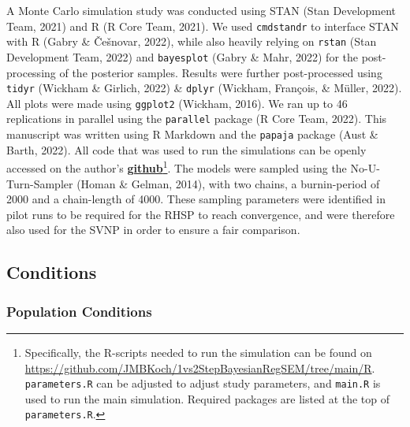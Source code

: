\documentclass[
  man, donotrepeattitle,floatsintext]{apa6}
\begin{document}
A Monte Carlo simulation study was conducted using STAN (Stan Development Team, 2021) and R (R Core Team, 2021). We used \texttt{cmdstandr} to interface STAN with R (Gabry \& Češnovar, 2022), while also heavily relying on \texttt{rstan} (Stan Development Team, 2022) and \texttt{bayesplot} (Gabry \& Mahr, 2022) for the post-processing of the posterior samples. Results were further post-processed using \texttt{tidyr} (Wickham \& Girlich, 2022) \& \texttt{dplyr} (Wickham, François, \& Müller, 2022). All plots were made using \texttt{ggplot2} (Wickham, 2016). We ran up to 46 replications in parallel using the \texttt{parallel} package (R Core Team, 2022). This manuscript was written using R Markdown and the \texttt{papaja} package (Aust \& Barth, 2022). All code that was used to run the simulations can be openly accessed on the author's \href{https://github.com/JMBKoch/1vs2StepBayesianRegSEM}{\textbf{github}}\footnote{Specifically, the R-scripts needed to run the simulation can be found on \url{https://github.com/JMBKoch/1vs2StepBayesianRegSEM/tree/main/R}. \texttt{parameters.R} can be adjusted to adjust study parameters, and \texttt{main.R} is used to run the main simulation. Required packages are listed at the top of \texttt{parameters.R}.}. The models were sampled using the No-U-Turn-Sampler (Homan \& Gelman, 2014), with two chains, a burnin-period of 2000 and a chain-length of 4000. These sampling parameters were identified in pilot runs to be required for the RHSP to reach convergence, and were therefore also used for the SVNP in order to ensure a fair comparison.

\hypertarget{conditions}{%
\subsection{Conditions}\label{conditions}}

\hypertarget{population-conditions}{%
\subsubsection{Population Conditions}\label{population-conditions}}
\end{document}
